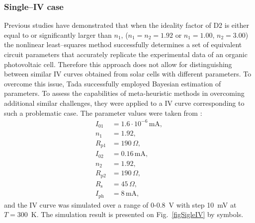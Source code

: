 \documentclass[a4paper,fleqn]{cas-dc}
\begin{document}
\subsubsection{Single--IV case}\label{SingleIV}

Previous studies have demonstrated \cite{Tada2015Organic,Tada2021} that when the ideality factor of D2 is either equal to or significantly larger than $n_1$,
($n_1=n_2=1.92$ or $n_1=1.00$, $n_2=3.00$) the nonlinear least--squares method successfully determines a set of equivalent circuit parameters
that accurately replicate the experimental data of an organic photovoltaic cell.
Therefore this approach does not allow for distinguishing between similar IV curves obtained from solar cells with different parameters.
To overcome this issue, Tada \cite{Tada2021} successfully employed Bayesian estimation of parameters.
To assess the capabilities of meta-heuristic methods in overcoming additional similar challenges,
they were applied to a IV curve corresponding to such a problematic case.
The parameter values were taken from \cite{Tada2021}:
\begin{equation}
\label{eqParSingleIV}
\begin{split}
I_{01}&=1.6\cdot10^{-6}\,\text{mA},\\
n_1&=1.92,\\
R_\mathrm{p1}&=190\,\Omega,\\
I_{02}&=0.16\,\text{mA},\\
n_2&=1.92,\\
R_\mathrm{p2}&=190\,\Omega,\\
R_\mathrm{s}&=45\,\Omega,\\
I_\mathrm{ph}&=8\,\text{mA},
\end{split}
\end{equation}
and the IV curve was simulated over a range of 0-0.8~V with step 10~mV at $T=300$~K.
The simulation result is presented on Fig.~\ref{figSigleIV} by symbols.
\end{document}
